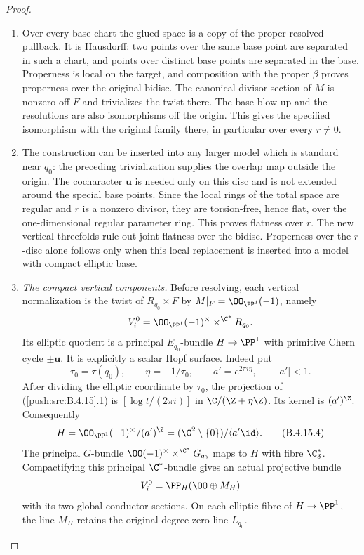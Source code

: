 \begin{proof}
\begin{enumerate}[label=\arabic*.,leftmargin=*]
\item Over every base chart the glued space is a copy of the
proper resolved pullback. It is Hausdorff: two points
over the same base point are separated in such a chart,
and points over distinct base points are separated in
the base. Properness is local on the target, and
composition with the proper $\beta$ proves properness
over the original bidisc. The canonical divisor section
of $M$ is nonzero off $F$ and trivializes the twist there.
The base blow-up and the resolutions are also
isomorphisms off the origin. This gives the specified
isomorphism with the original family there, in particular
over every $r\ne0$.

\item The construction can be inserted into any larger model
which is standard near $q_0$: the preceding
trivialization supplies the overlap map outside the
origin. The cocharacter $\mathbf u$ is needed only on
this disc and is not extended around the special base
points. Since the local rings of the total space are
regular and $r$ is a nonzero divisor, they are
torsion-free, hence flat, over the one-dimensional
regular parameter ring. This proves flatness over $r$.
The new vertical threefolds rule out joint flatness over
the bidisc. Properness over the $r$-disc alone follows
only when this local replacement is inserted into a
model with compact elliptic base.

\item \emph{The compact vertical components.}
Before resolving, each vertical normalization is the
twist of $R_{q_0}\times F$ by
$M|_F=\OO_{\PP^1}(-1)$, namely
\[
 V_i^0=\OO_{\PP^1}(-1)^\times
                    \mathbin{\times^{\C^*}}R_{q_0}.
\]
Its elliptic quotient is a principal $E_{q_0}$-bundle
$H\to\PP^1$ with primitive Chern cycle
$\pm\mathbf u$. It is explicitly a scalar Hopf surface.
Indeed put
\[
 \tau_0=\tau(q_0),\qquad
 \eta=-1/\tau_0,\qquad a'=e^{2\pi i\eta},
 \qquad |a'|<1.
\]
After dividing the elliptic coordinate by $\tau_0$,
the projection of (\ref{push:src:B.4.15}.1) is
$[\log t/(2\pi i)]$ in $\C/(\Z+\eta\Z)$.
Its kernel is $(a')^\Z$. Consequently
\[
 H=\OO_{\PP^1}(-1)^\times/(a')^\Z
   =(\C^2\setminus\{0\})/\langle a'\id\rangle.
 \tag{B.4.15.4}
\]
The principal $G$-bundle
$\OO(-1)^\times\mathbin{\times^{\C^*}}G_{q_0}$
maps to $H$ with fibre $\C^*_{\delta}$.
Compactifying this principal $\C^*$-bundle gives an
actual projective bundle
\[
 V_i^0=\PP_H(\OO\oplus M_H)
\]
with its two global conductor sections. On each
elliptic fibre of $H\to\PP^1$, the line $M_H$ retains
the original degree-zero line $L_{q_0}$.


\end{enumerate}
\end{proof}
